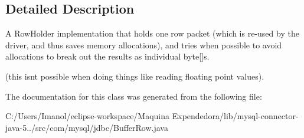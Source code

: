 \subsection{Detailed Description}
A Row\+Holder implementation that holds one row packet (which is re-\/used by the driver, and thus saves memory allocations), and tries when possible to avoid allocations to break out the results as individual byte\mbox{[}\mbox{]}s.

(this isn\textquotesingle{}t possible when doing things like reading floating point values). 

The documentation for this class was generated from the following file\+:\begin{DoxyCompactItemize}
\item 
C\+:/\+Users/\+Imanol/eclipse-\/workspace/\+Maquina Expendedora/lib/mysql-\/connector-\/java-\/5../src/com/mysql/jdbc/Buffer\+Row.\+java\end{DoxyCompactItemize}
